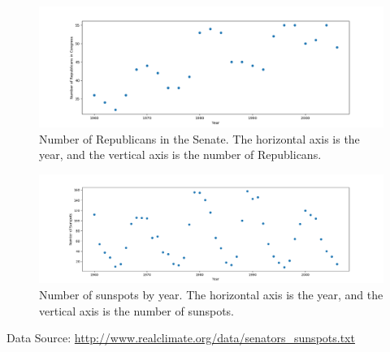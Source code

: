 \documentclass[submit]{harvardml}
\begin{document}
\begin{figure}[h]
\centering
\includegraphics[width=\textwidth]{data/year-republicans}
\caption{Number of Republicans in the Senate.  The horizontal axis is the year, and the vertical axis is the number of Republicans.}
\label{fig:congress}
\end{figure}

\begin{figure}[h]
\centering
\includegraphics[width=\textwidth]{data/year-sunspots}
\caption{Number of sunspots by year.  The horizontal axis is the year, and the vertical axis is the number of sunspots.}
\label{fig:sunspots}
\end{figure}

Data Source: \url{http://www.realclimate.org/data/senators_sunspots.txt}
\end{document}

